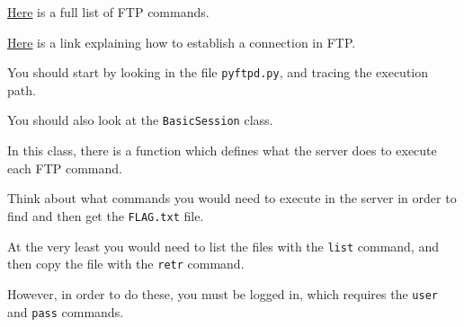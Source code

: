 {{{                    \href{https://en.wikipedia.org/wiki/List_of_FTP_commands}{Here} is a full list of FTP commands.















                    \href{https://www.serv-u.com/resource/tutorial/pasv-response-epsv-port-pbsz-rein-ftp-command#fac52a38-7ddb-4815-a9dc-72cc03c0a8e6}{Here} is a link explaining how to establish a connection in FTP.















                    You should start by looking in the file \lstinline`pyftpd.py`, and tracing the execution path. %







You should also look at the \lstinline`BasicSession` class. %







In this class, there is a function which defines what the server does to execute each FTP command. %







Think about what commands you would need to execute in the server in order to find and then get the \lstinline`FLAG.txt` file. 















                    At the very least you would need to list the files with the \lstinline`list` command, and then copy the file with the \lstinline`retr` command. %







However, in order to do these, you must be logged in, which requires the \lstinline`user` and \lstinline`pass` commands. %







}}}
